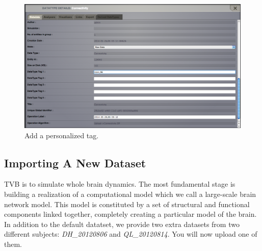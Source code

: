 \documentclass{tufte-handout}
\begin{document}
\begin{figure}[h]
  \includegraphics[width=\linewidth]{Handout_UI_LinkAndShare_TagDatatype}%
  \caption{Add a personalized tag.}%
  \label{fig:tag}%
\end{figure}


\subsection{Importing A New Dataset}\label{sec:import_datastet}

 TVB is to simulate whole brain dynamics. 
The most fundamental stage is building a realization of a computational model which we call a large-scale brain network model. This model is constituted by a set of structural and functional components linked together, completely creating a particular model of the brain.
In addition to the default datatset, we provide two extra datasets from two different subjects: \textit{DH\_20120806} and \textit{QL\_20120814}. You will now upload one of them. 
\end{document}
